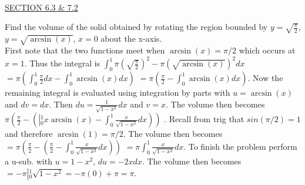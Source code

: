 \documentclass{exam}
\begin{document}
\begin{questions}
\begin{parts}
\end{parts}


\ \\
\underline{SECTION 6.3 \& 7.2 }

\question Find the volume of the solid obtained by rotating the region bounded by $y = \sqrt{\frac{\pi}{2}}$, $y= \sqrt{\arcsin(x)}$, $x=0$ about the x-axis.
\\ {\color{red} First note that the two functions meet when $\arcsin(x)=\pi/2$ which occurs at $x=1$.  Thus the integral is $\displaystyle\int_0^1 \pi \left( \sqrt{\frac{\pi}{2}} \right)^2 - \pi \left( \sqrt{\arcsin(x)} \right)^2 dx$ $ = \pi \left( \displaystyle\int_0^1 \frac{\pi}{2} dx - \displaystyle\int_0^1 \arcsin(x)dx \right)$ $ = \pi \left( \frac{\pi}{2} - \displaystyle\int_0^1 \arcsin(x)dx \right) $.  Now the remaining integral is evaluated using integration by parts with $u=\arcsin(x)$ and $dv=dx$.  Then $du = \frac{1}{\sqrt{1-x^2}}dx$ and $v=x$.  The volume then becomes $\pi \left( \frac{\pi}{2} - \left( \left|_0^1 x\arcsin(x) \right. - \displaystyle\int_0^1 \frac{x}{\sqrt{1-x^2}} dx \right) \right) $ .   Recall from trig that $sin(\pi/2)=1$ and therefore $\arcsin(1)=\pi/2$.  The volume then becomes 
$= \pi \left( \frac{\pi}{2} - \left( \frac{\pi}{2}  - \displaystyle\int_0^1 \frac{x}{\sqrt{1-x^2}} dx \right) \right) $
$= \pi  \displaystyle\int_0^1 \frac{x}{\sqrt{1-x^2}} dx  $.  To finish the problem perform a u-sub. with $u=1-x^2$, $du=-2xdx$.  The volume then becomes $ = -\pi \left|_0^1 \sqrt{1-x^2}  \right. = -\pi(0) + \pi = \pi$.
}  

    \newpage\thispagestyle{empty}


\end{questions}
\end{document}

